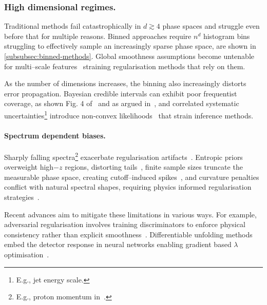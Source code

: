         \subsubsection{High dimensional regimes.}  
            Traditional methods fail catastrophically in \(d \gtrsim 4\) phase spaces and struggle even before that for multiple reasons.
            Binned approaches require \(n^d\) histogram bins struggling to effectively sample an increasingly sparse phase space, are shown in \cref{subsubsec:binned-methods}.
            Global smoothness assumptions become untenable for multi--scale features~\cite{fernandez-martinez_curse_2020, xia_bayesian_2022, hocker_svd_1996} straining regularisation methods that rely on them. 

            As the number of dimensions increases, the binning also increasingly distorts error propagation. 
            Bayesian credible intervals can exhibit poor frequentist coverage, as shown Fig. 4 of~\cite{Zhang2006AIntervals} and as argued in~\cite{eberly_estimating_2003, szabo_frequentist_2015}, and correlated systematic uncertainties\footnote{E.g., jet energy scale.} introduce non-convex likelihoods~\cite{berger_simplified_2023, Berger2017LectureATLAS} that strain inference methods.

        \paragraph{Spectrum dependent biases.}  
            Sharply falling spectra\footnote{E.g., proton momentum in~\cite{arnison_transverse_1982}.} exacerbate regularisation artifacts~\cite{gaponenko_practical_2020}.
            Entropic priors overweight high\(-z\) regions, distorting tails~\cite{caticha_entropic_2004, rodriguez_entropic_2002, Handley2019Maximum-EntropyDistribution, brewer_entropic_2009},
            finite sample sizes truncate the measurable phase space, creating cutoff--induced spikes~\cite{finotello_functional_2025, marchand_bayesian_2012},
            and curvature penalties conflict with natural spectral shapes, requiring physics informed regularisation strategies~\cite{lee_explicit_2023, moosavi-dezfooli_robustness_2018, zech_analysis_2016, Baron2020ExtendingMethod}.  

        Recent advances aim to mitigate these limitations in various ways.
        For example, adversarial regularisation involves training discriminators to enforce physical consistency rather than explicit smoothness~\cite{Terjek2019AdversarialRegularization}.
        Differentiable unfolding methods embed the detector response in neural networks enabling gradient based \(\lambda\) optimisation~\cite{delaRosa2020DifferentiableAnalysis}.
        
